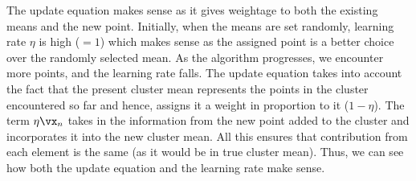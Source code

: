 \documentclass[a4paper,11pt]{article}
\begin{document}
\begin{mlsolution}
\pagebreak

The update equation makes sense as it gives weightage to both the existing means and the new point. Initially, when the means are set randomly, learning rate $\eta$ is high ($=1$) which makes sense as the assigned point is a better choice over the randomly selected mean. 
As the algorithm progresses, we encounter more points, and the learning rate falls. The update equation takes into account the fact that the present cluster mean represents the points in the cluster encountered so far and hence, assigns it a weight in proportion to it ($1-\eta$). 
The term $\eta \vx_n$ takes in the information from the new point added to the cluster and incorporates it into the new cluster mean. All this ensures that contribution from each element is the same (as it would be in true cluster mean). Thus, we can see how both the update equation and the learning rate make sense.


\end{mlsolution}
	
\end{document}
